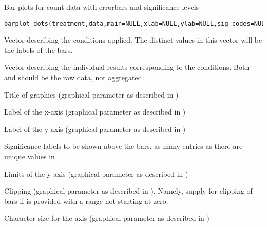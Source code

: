\documentclass[a4paper]{book}
\begin{document}
%
\begin{Description}\relax
Bar plots for count data with errorbars and significance levels
\end{Description}
%
\begin{Usage}
\begin{verbatim}
barplot_dots(treatment,data,main=NULL,xlab=NULL,ylab=NULL,sig_codes=NULL,ylim=NULL,xpd=NA,cex.axis=NULL,cex.lab=NULL,...)
\end{verbatim}
\end{Usage}
%
\begin{Arguments}
\begin{ldescription}
\item[\code{treatment}] 
Vector describing the conditions applied. The distinct values in this vector will be the labels of the bars.

\item[\code{data}] 
Vector describing the individual results corresponding to the  conditions. Both  and  should be the raw data, not aggregated.

\item[\code{main}] 
Title of graphics (graphical parameter as described in )


\item[\code{xlab}] 
Label of the x-axis (graphical parameter as described in )

\item[\code{ylab}] 
Label of the y-axis (graphical parameter as described in )

\item[\code{sig\_codes}] 
Significance labels to be shown above the bars, as many entries as there are unique values in 

\item[\code{ylim}] 
Limits of the y-axis (graphical parameter as described in )


\item[\code{xpd}] 
Clipping (graphical parameter as described in ). Namely, supply  for clipping of bars if  is provided with a range not starting at zero.


\item[\code{cex.axis}] 
Character size for the axis (graphical parameter as described in )



\end{ldescription}
\end{Arguments}
\end{document}
